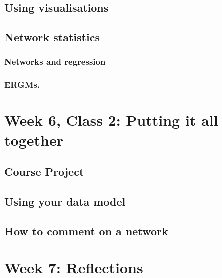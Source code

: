 \documentclass[
]{book}
\begin{document}
\hypertarget{using-visualisations}{%
\section{Using visualisations}\label{using-visualisations}}

\hypertarget{network-statistics}{%
\section{Network statistics}\label{network-statistics}}

\hypertarget{networks-and-regression}{%
\subsection{Networks and regression}\label{networks-and-regression}}

\hypertarget{ergms.}{%
\subsection{ERGMs.}\label{ergms.}}

\hypertarget{week-6-class-2-putting-it-all-together}{%
\chapter{Week 6, Class 2: Putting it all together}\label{week-6-class-2-putting-it-all-together}}

\hypertarget{course-project}{%
\section{Course Project}\label{course-project}}

\hypertarget{using-your-data-model}{%
\section{Using your data model}\label{using-your-data-model}}

\hypertarget{how-to-comment-on-a-network}{%
\section{How to comment on a network}\label{how-to-comment-on-a-network}}

\hypertarget{week-7-reflections}{%
\chapter{Week 7: Reflections}\label{week-7-reflections}}
\end{document}
